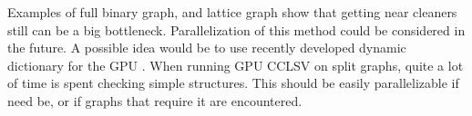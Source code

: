 Examples of full binary graph, and lattice graph show that getting near cleaners still can be a big bottleneck. Parallelization of this method could be considered in the future. A possible idea would be to use recently developed dynamic dictionary for the GPU \cite{Ashkiani2018}. When running GPU CCLSV on split graphs, quite a lot of time is spent checking simple structures. This should be easily parallelizable if need be, or if graphs that require it are encountered.







